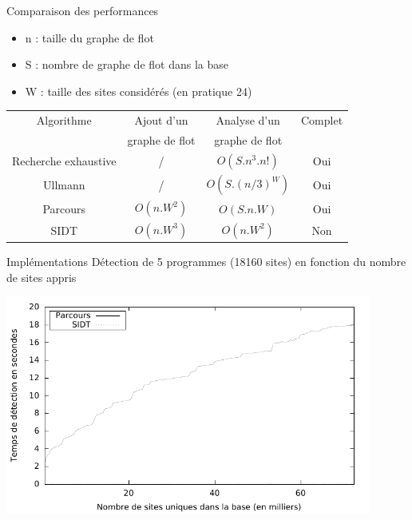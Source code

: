 \documentclass{beamer}
\begin{document}
\begin{frame}{Comparaison des performances}
\begin{itemize}
 \item n : taille du graphe de flot
 \item S : nombre de graphe de flot dans la base
 \item W : taille des sites considérés (en pratique 24)
\end{itemize}

\begin{center}
\begin{tabular}{|c|c|c|c|}
 \hline
 Algorithme & Ajout d'un & Analyse d'un & Complet\\
   & graphe de flot & graphe de flot & \\
 \hline
 Recherche exhaustive & / & $O(S.n^3.n!)$ & Oui\\
 Ullmann & / & $O(S.(n/3)^W)$ & Oui \\
 Parcours & $O(n.W^2)$ & $O(S.n.W)$ & Oui\\
 SIDT & $O(n.W^3)$ & $O(n.W^2)$ & Non\\
 \hline
\end{tabular} 
\end{center}
\end{frame}

\begin{frame}{Implémentations}
Détection de 5 programmes (18160 sites) en fonction du nombre de sites appris
\begin{center}
\includegraphics[width=0.9\textwidth]{supports/plots/plotScan.pdf}
\end{center}
\end{frame}
\end{document}
